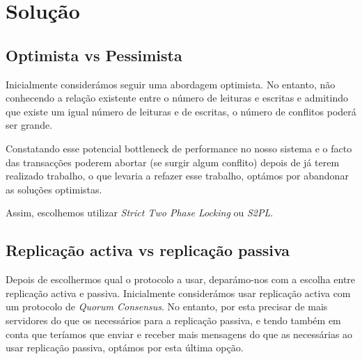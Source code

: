 \section{Solução}

\subsection{Optimista vs Pessimista}
\label{Optimista vs Pessimista}
Inicialmente considerámos seguir uma abordagem optimista. No entanto, não conhecendo a relação existente entre o número de leituras e escritas e admitindo que existe um igual número de leituras e de escritas, o número de conflitos poderá ser grande. 

Constatando esse potencial bottleneck de performance no nosso sistema e o facto das transacções poderem abortar (se surgir algum conflito) depois de já terem realizado trabalho, o que levaria a refazer esse trabalho, optámos por abandonar as soluções optimistas.

Assim, escolhemos utilizar \textit{Strict Two Phase Locking} ou \textit{S2PL}.

\subsection{Replicação activa vs replicação passiva}

Depois de escolhermos qual o protocolo a usar, deparámo-nos com a escolha entre replicação activa e passiva. Inicialmente considerámos usar replicação activa com um protocolo de \textit{Quorum Consensus}. No entanto, por esta precisar de mais servidores do que os necessários para a replicação passiva, e tendo também em conta que teríamos que enviar e receber mais mensagens do que as necessárias ao usar replicação passiva, optámos por esta última opção.
